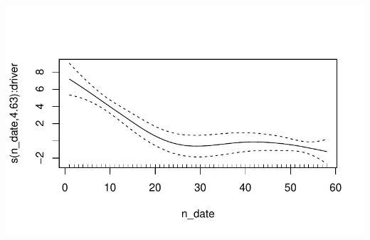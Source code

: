 \documentclass[
  letterpaper,
  DIV=11,
  numbers=noendperiod]{scrartcl}
\begin{document}
\includegraphics{dlm_gam_comparison_files/figure-pdf/unnamed-chunk-5-6.pdf}
\end{document}
